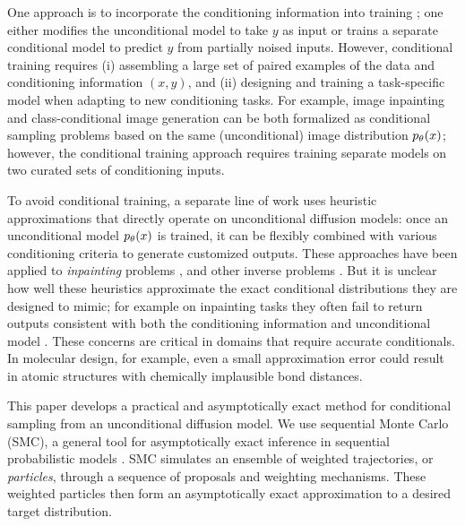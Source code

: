 One approach is to incorporate the conditioning information into training \citep[e.g.][]{dhariwal2021diffusion,ramesh2022hierarchical};
one either modifies the unconditional model to take $y$ as input or trains a separate conditional model to predict $y$ from partially noised inputs.
However, conditional training requires 
(i) assembling a large set of paired examples of the data and conditioning information $(x, y)$, and (ii) designing and training a task-specific model when adapting to new conditioning tasks.
For example, image inpainting and class-conditional image generation can be both formalized as conditional sampling problems based on the same (unconditional) image distribution $p_{\theta}(x)$; however, the conditional training approach requires training separate models on two curated sets of conditioning inputs. 

To avoid conditional training, a separate line of work uses heuristic approximations that directly operate on unconditional diffusion models: once an unconditional model $p_{\theta}(x)$ is trained, it can be flexibly combined with various conditioning criteria to generate customized outputs. These approaches have been applied to \emph{inpainting} problems \citep{meng2021sdedit,song2020score,trippe2022diffusion}, and other inverse problems \citep{bansal2023universal,chung2022diffusion,hovideo, song2023pseudoinverse}.
But it is unclear how well these heuristics approximate the exact conditional distributions they are designed to mimic; for example on inpainting tasks they often fail to return outputs consistent with both the conditioning information and unconditional model \citep{zhang2023towards}.
These concerns are critical in domains that require accurate conditionals. 
In molecular design, for example, even a small approximation error could result in atomic structures with chemically implausible bond distances.

This paper develops a practical and asymptotically exact method for conditional sampling from an unconditional diffusion model.
We use sequential Monte Carlo (SMC), a general tool for asymptotically exact inference in sequential probabilistic models  \citep{chopin2020introduction,doucet2001sequential,naesseth2019elements}.
SMC simulates an ensemble of weighted trajectories, or \emph{particles}, through a sequence of proposals and weighting mechanisms. 
These weighted particles then form an asymptotically exact approximation to a desired target distribution. 

